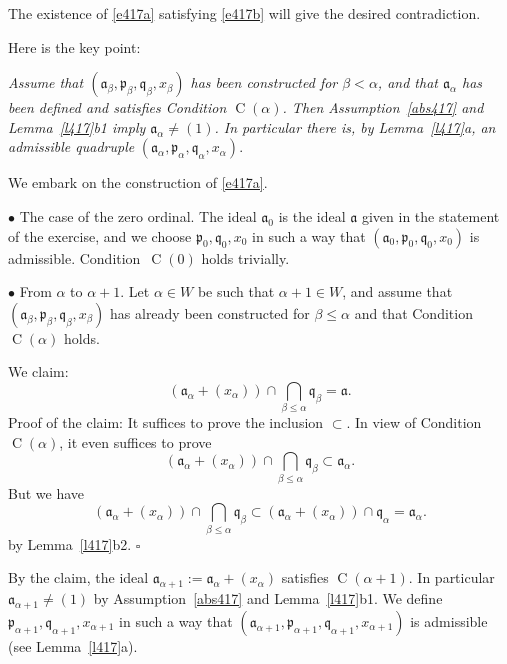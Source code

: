 \documentclass[parskip=half,fontsize=12pt]{scrartcl}%
\newcommand{\oo}{\operatorname}\newcommand{\ooo}{\operatorname*}
\newcommand{\mf}{\mathfrak}
\newcommand{\aaa}{\mf a}
\newcommand{\ppp}{\mf p}
\newcommand{\qqq}{\mf q}
\newcommand{\bu}{\bullet}
\begin{document}
The existence of \eqref{e417a} satisfying \eqref{e417b} will give the desired contradiction.

Here is the key point:

\emph{Assume that $(\aaa_\beta,\ppp_\beta,\qqq_\beta,x_\beta)$ has been constructed for $\beta<\alpha$, and that $\aaa_\alpha$ has been defined and satisfies Condition $\oo C(\alpha)$. Then Assumption~\eqref{abs417} and Lemma~\ref{l417}b1 imply $\aaa_\alpha\ne(1)$. In particular there is, by Lemma~\ref{l417}a, an admissible quadruple} $(\aaa_\alpha,\ppp_\alpha,\qqq_\alpha,x_\alpha)$.

We embark on the construction of \eqref{e417a}.

$\bu$ The case of the zero ordinal. The ideal $\aaa_0$ is the ideal $\aaa$ given in the statement of the exercise, and we choose $\ppp_0,\qqq_0,x_0$ in such a way that $(\aaa_0,\ppp_0,\qqq_0,x_0)$ is admissible. Condition~$\oo C(0)$ holds trivially.

$\bu$ From $\alpha$ to $\alpha+1$. Let $\alpha\in W$ be such that $\alpha+1\in W$, and assume that $(\aaa_\beta,\ppp_\beta,\qqq_\beta,x_\beta)$ has already been constructed for $\beta\le\alpha$ and that Condition $\oo C(\alpha)$ holds. 

We claim: 
$$
(\aaa_\alpha+(x_\alpha))\cap\bigcap_{\beta\le\alpha}\qqq_\beta=\aaa.
$$ 
Proof of the claim: It suffices to prove the inclusion $\subset$. In view of Condition $\oo C(\alpha)$, it even suffices to prove 
$$
(\aaa_\alpha+(x_\alpha))\cap\bigcap_{\beta\le\alpha}\qqq_\beta\subset\aaa_\alpha.
$$ 
But we have 
$$
(\aaa_\alpha+(x_\alpha))\cap\bigcap_{\beta\le\alpha}\qqq_\beta\subset(\aaa_\alpha+(x_\alpha))\cap\qqq_\alpha=\aaa_\alpha.
$$ 
by Lemma~\ref{l417}b2. $\square$

By the claim, the ideal $\aaa_{\alpha+1}:=\aaa_\alpha+(x_\alpha)$ satisfies $\oo C(\alpha+1)$. In particular $\aaa_{\alpha+1}\ne(1)$ by Assumption~\eqref{abs417} and Lemma~\ref{l417}b1. We define $\ppp_{\alpha+1},\qqq_{\alpha+1},x_{\alpha+1}$ in such a way that $(\aaa_{\alpha+1},\ppp_{\alpha+1},\qqq_{\alpha+1},x_{\alpha+1})$ is admissible (see Lemma~\ref{l417}a).

\end{document}
